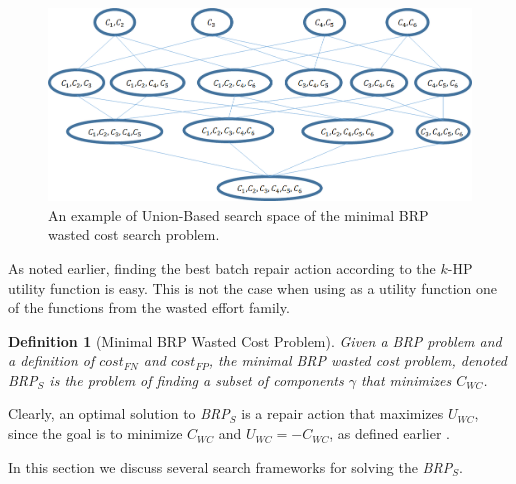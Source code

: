 \documentclass[a4paper,11pt]{report}
\newcommand\meir[1]{\textcolor{red}{meir: #1}}
\newcommand\roni[1]{\textcolor{green}{roni: #1}}
\newtheorem{definition}{Definition}
\newcommand{\brps}{\textit{BRP$_S$}}
\begin{document}
\begin{figure}%
\centering
\includegraphics[width=0.85\columnwidth]{UnionBasedSearch.png}%
\caption{An example of Union-Based search space of the minimal BRP wasted cost search problem.}%
\label{fig:union-search-space}%
\end{figure}

As noted earlier, finding the best batch repair action according to the $k$-HP utility function is easy. 
This is not the case when using as a utility function 
one of the functions from the wasted effort family. 

\begin{definition}[Minimal BRP Wasted Cost Problem]
Given a BRP problem and a definition of $cost_{FN}$ and $cost_{FP}$, the minimal BRP wasted cost problem, denoted \brps{} is the problem of 
finding a subset of components $\gamma$ that minimizes $C_{WC}$. 
\end{definition}
Clearly, an optimal solution to \brps{} is a repair action that maximizes $U_{WC}$, since the goal is to minimize $C_{WC}$ and $U_{WC} = - C_{WC}$, as defined earlier .

In this section we discuss several search frameworks for solving the \brps{}.


\end{document}
